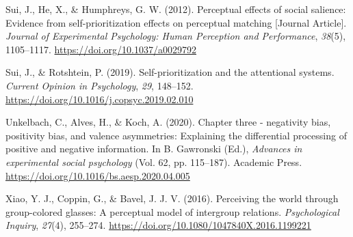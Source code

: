 \documentclass[
  man]{apa6}
\newlength{\cslhangindent}
\newlength{\cslentryspacingunit} %
\newenvironment{CSLReferences}[2] %
 {%
  \setlength{\parindent}{0pt}
  \ifodd #1
  \let\oldpar\par
  \def\par{\hangindent=\cslhangindent\oldpar}
  \fi
  \setlength{\parskip}{#2\cslentryspacingunit}
 }%
 {}
\begin{document}
\begin{CSLReferences}{1}{0}
\leavevmode{}%
Sui, J., He, X., \& Humphreys, G. W. (2012). Perceptual effects of social salience: Evidence from self-prioritization effects on perceptual matching {[}Journal Article{]}. \emph{Journal of Experimental Psychology: Human Perception and Performance}, \emph{38}(5), 1105--1117. \url{https://doi.org/10.1037/a0029792}

\leavevmode{}%
Sui, J., \& Rotshtein, P. (2019). Self-prioritization and the attentional systems. \emph{Current Opinion in Psychology}, \emph{29}, 148--152. \url{https://doi.org/10.1016/j.copsyc.2019.02.010}

\leavevmode{}%
Unkelbach, C., Alves, H., \& Koch, A. (2020). Chapter three - negativity bias, positivity bias, and valence asymmetries: Explaining the differential processing of positive and negative information. In B. Gawronski (Ed.), \emph{Advances in experimental social psychology} (Vol. 62, pp. 115--187). Academic Press. \url{https://doi.org/10.1016/bs.aesp.2020.04.005}

\leavevmode{}%
Xiao, Y. J., Coppin, G., \& Bavel, J. J. V. (2016). Perceiving the world through group-colored glasses: A perceptual model of intergroup relations. \emph{Psychological Inquiry}, \emph{27}(4), 255--274. \url{https://doi.org/10.1080/1047840X.2016.1199221}

\end{CSLReferences}

\endgroup
\end{document}
